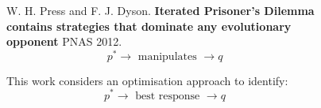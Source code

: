 \documentclass[usenames,dvipsnames,t]{beamer}
\begin{document}
\begin{columns}
    \begin{column}{.2\linewidth}
        \vspace{-.9cm}
        \begin{center}
            
        \end{center}
    \end{column}
    \begin{column}{.1\linewidth}
        \vspace{3.5cm}

            
    \end{column}
    \begin{column}{.25\linewidth}
        \vspace{1.5cm}

        \hspace{-2cm} 
    \end{column}
    \begin{column}{.1\linewidth}
        \vspace{1.5cm}

        
    \end{column}
    \begin{column}{.35\linewidth}
        \vspace{1cm}

        \small{
            W. H. Press and F. J. Dyson. \textbf{Iterated Prisoner’s
            Dilemma contains strategies that dominate any evolutionary opponent}
            PNAS 2012.%
            \[p ^ * \rightarrow \text{ manipulates } \rightarrow q\]
        }
        \vspace{1cm}

        \small{
        This work considers an optimisation approach to identify:
        \[ p ^ * \rightarrow \text{ best response } \rightarrow q\]
            }
    \end{column}
    \begin{column}{.2\linewidth}
    \end{column}
\end{columns}
\end{document}
